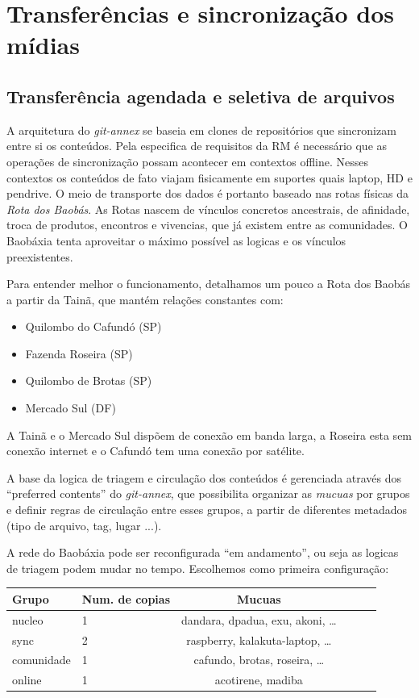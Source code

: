\chapter{Transferências e sincronização dos mídias}\label{Transferências e sincronização dos mídias}\lhead{\leftmark}

\section{Transferência agendada e seletiva de arquivos}
A arquitetura do \emph{git-annex} se baseia em clones de repositórios
que sincronizam entre si os conteúdos. Pela especifica de requisitos
da RM é necessário que as operações de sincronização possam acontecer
em contextos offline. Nesses contextos os conteúdos de fato viajam
fisicamente em suportes quais laptop, HD e pendrive. O meio de
transporte dos dados é portanto baseado nas rotas físicas da
\emph{Rota dos Baobás}. As Rotas nascem de vínculos concretos
ancestrais, de afinidade, troca de produtos, encontros e vivencias,
que já existem entre as comunidades. O Baobáxia tenta aproveitar o
máximo possível as logicas e os vínculos preexistentes. 

Para entender melhor o funcionamento, detalhamos um pouco a Rota dos
Baobás a partir da Tainã, que mantém relações constantes com:
\begin{itemize}
  \item Quilombo do Cafundó (SP)
  \item Fazenda Roseira (SP)
  \item Quilombo de Brotas (SP)
  \item Mercado Sul (DF)
\end{itemize}

A Tainã e o Mercado Sul dispõem de conexão em banda larga, a Roseira
esta sem conexão internet e o Cafundó tem uma conexão por satélite.

A base da logica de triagem e circulação dos conteúdos é gerenciada
através dos ``preferred contents'' do \emph{git-annex}, que
possibilita organizar as \emph{mucuas} por grupos e definir regras de
circulação entre esses grupos, a partir de diferentes metadados (tipo
de arquivo, tag, lugar ...).

A rede do Baobáxia pode ser reconfigurada ``em andamento'', ou seja as
logicas de triagem podem mudar no tempo. Escolhemos como primeira
configuração:
\begin{table}[h]
  \centering
  \begin{tabularx}{\textwidth}{l|X| c X r X }
    \textbf{Grupo} & \textbf{Num. de copias} & \textbf{Mucuas} \\ [0.5ex]
    \hline                       
    nucleo & 1 & dandara, dpadua, exu, akoni, \ldots \\
    sync & 2 & raspberry, kalakuta-laptop, \ldots \\
    comunidade & 1 & cafundo, brotas, roseira, \ldots \\
    online & 1 & acotirene, madiba \\
    \hline  
  \end{tabularx}
\end{table}

